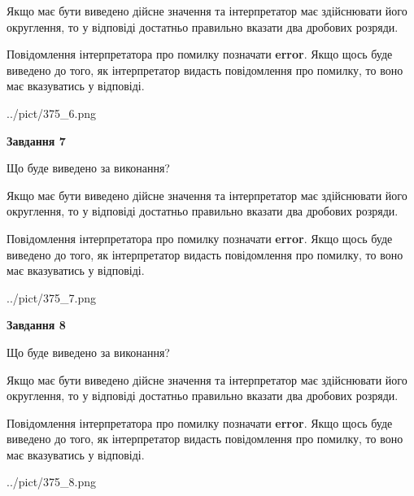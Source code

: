 \documentclass[12pt, ukrainian]{article}
\begin{document}
{\begin {Large}
Якщо має бути виведено дійсне значення та інтерпретатор має здійснювати його округлення, 
то у відповіді достатньо правильно вказати два дробових розряди.

Повідомлення інтерпретатора про помилку позначати \textbf{error}.
Якщо щось буде виведено до того, як інтерпретатор видасть повідомлення про помилку, 
то воно має вказуватись у відповіді. \par

\begin{center}
	{../pict/375_6.png}
\end{center}
\newpage

{\begin {center}\textbf{Завдання 7}\end {center}}\par
Що буде виведено за виконання? \par

Якщо має бути виведено дійсне значення та інтерпретатор має здійснювати його округлення, 
то у відповіді достатньо правильно вказати два дробових розряди.

Повідомлення інтерпретатора про помилку позначати \textbf{error}.
Якщо щось буде виведено до того, як інтерпретатор видасть повідомлення про помилку, 
то воно має вказуватись у відповіді. \par

\begin{center}
	{../pict/375_7.png}
\end{center}
\newpage

{\begin {center}\textbf{Завдання 8}\end {center}}\par
Що буде виведено за виконання? \par

Якщо має бути виведено дійсне значення та інтерпретатор має здійснювати його округлення, 
то у відповіді достатньо правильно вказати два дробових розряди.

Повідомлення інтерпретатора про помилку позначати \textbf{error}.
Якщо щось буде виведено до того, як інтерпретатор видасть повідомлення про помилку, 
то воно має вказуватись у відповіді. \par

\begin{center}
	{../pict/375_8.png}
\end{center}
\newpage


\end{Large}}
\end{document}
